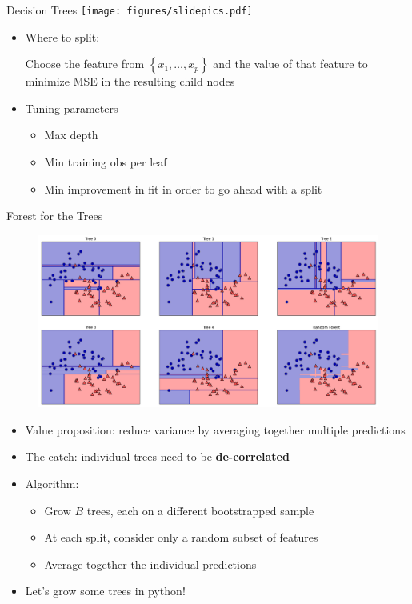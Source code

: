 \documentclass{beamer}
\begin{document}
\begin{frame}{Decision Trees}
\texttt{[image: figures/slidepics.pdf]} 
\begin{itemize}
	\item Where to split:
	
	Choose the feature from $\left\{x_1,\ldots,x_p \right\}$ and the value of that feature to minimize MSE in the resulting child nodes
	\item Tuning parameters
	\begin{itemize}
		\item Max depth
		\item Min training obs per leaf
		\item Min improvement in fit in order to go ahead with a split
	\end{itemize}
\end{itemize}
\end{frame}
\begin{frame}{Forest for the Trees}
\begin{figure}
\includegraphics[scale=.2]{figures/randomforest}
\end{figure}
\begin{itemize}
	\item Value proposition: reduce variance by averaging together multiple predictions
	\item The catch: individual trees need to be \textbf{de-correlated}
	\item Algorithm:
	\begin{itemize}
		\item Grow $B$ trees, each on a different bootstrapped sample 
		\item At each split, consider only a random subset of features
		\item Average together the individual predictions
	\end{itemize}
	\item Let's grow some trees in python!
\end{itemize}
\end{frame}
\end{document}
